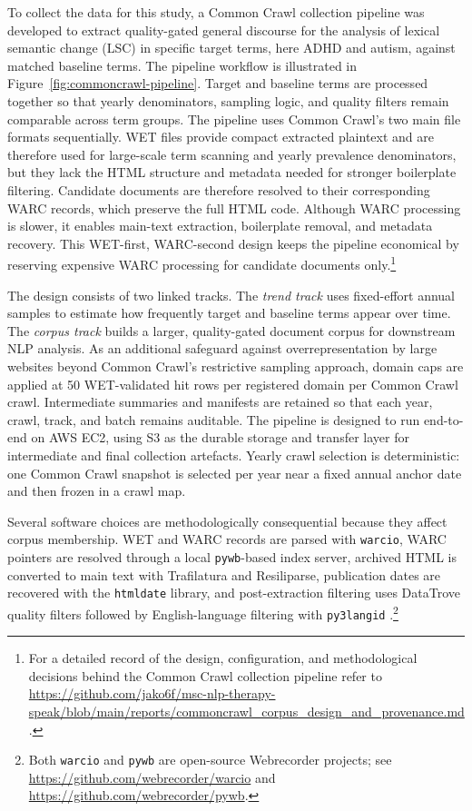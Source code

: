 To collect the data for this study, a Common Crawl collection pipeline was developed to extract quality-gated general discourse for the analysis of lexical semantic change (LSC) in specific target terms, here ADHD and autism, against matched baseline terms. The pipeline workflow is illustrated in Figure~\ref{fig:commoncrawl-pipeline}. Target and baseline terms are processed together so that yearly denominators, sampling logic, and quality filters remain comparable across term groups. The pipeline uses Common Crawl's two main file formats sequentially. WET files provide compact extracted plaintext and are therefore used for large-scale term scanning and yearly prevalence denominators, but they lack the HTML structure and metadata needed for stronger boilerplate filtering. Candidate documents are therefore resolved to their corresponding WARC records, which preserve the full HTML code. Although WARC processing is slower, it enables main-text extraction, boilerplate removal, and metadata recovery. This WET-first, WARC-second design keeps the pipeline economical by reserving expensive WARC processing for candidate documents only.\footnote{For a detailed record of the design, configuration, and methodological decisions behind the Common Crawl collection pipeline refer to \url{https://github.com/jako6f/msc-nlp-therapy-speak/blob/main/reports/commoncrawl_corpus_design_and_provenance.md}.}

The design consists of two linked tracks. The \textit{trend track} uses fixed-effort annual samples to estimate how frequently target and baseline terms appear over time. The \textit{corpus track} builds a larger, quality-gated document corpus for downstream NLP analysis. As an additional safeguard against overrepresentation by large websites beyond Common Crawl’s restrictive sampling approach, domain caps are applied at 50 WET-validated hit rows per registered domain per Common Crawl crawl. Intermediate summaries and manifests are retained so that each year, crawl, track, and batch remains auditable. The pipeline is designed to run end-to-end on AWS EC2, using S3 as the durable storage and transfer layer for intermediate and final collection artefacts. Yearly crawl selection is deterministic: one Common Crawl snapshot is selected per year near a fixed annual anchor date and then frozen in a crawl map.

Several software choices are methodologically consequential because they affect corpus membership. WET and WARC records are parsed with \texttt{warcio}, WARC pointers are resolved through a local \texttt{pywb}-based index server, archived HTML is converted to main text with Trafilatura and Resiliparse, publication dates are recovered with the \texttt{htmldate} library, and post-extraction filtering uses DataTrove quality filters followed by English-language filtering with \texttt{py3langid} \citep{bevendorffElasticChatNoirSearch2018,barbaresiTrafilaturaWebScraping2021,penedoDataTroveLargeScale2026,luiLangidpyOfftheshelfLanguage2012,barbaresiHtmldatePythonPackage2020}.\footnote{Both \texttt{warcio} and \texttt{pywb} are open-source Webrecorder projects; see \url{https://github.com/webrecorder/warcio} and \url{https://github.com/webrecorder/pywb}.} 


